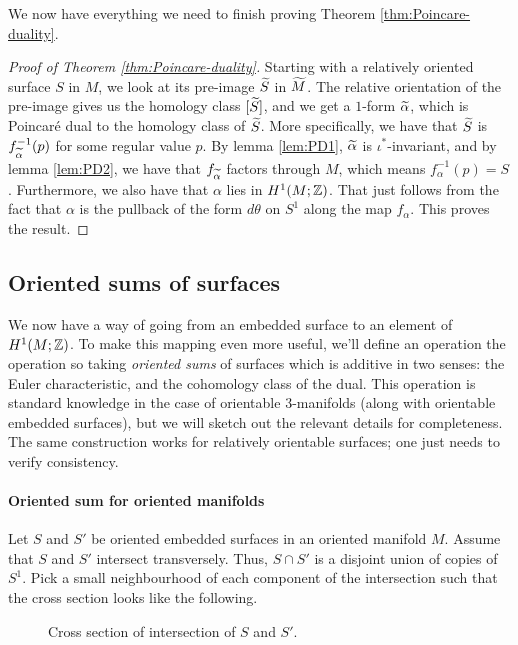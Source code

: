 We now have everything we need to finish proving Theorem \ref{thm:Poincare-duality}.
\begin{proof}[Proof of Theorem \ref{thm:Poincare-duality}]
  Starting with a relatively oriented surface $S$ in $M$, we look at its pre-image $\widetilde{S}$ in
  $\widetilde{M}$. The relative orientation of the pre-image gives us the homology class $[\widetilde{S}]$, and
  we get a $1$-form $\widetilde{\alpha}$, which is Poincar\'e dual to the homology class of $\widetilde{S}$.
  More specifically, we have that $\widetilde{S}$ is $f^{-1}_{\widetilde{\alpha}}(p)$ for some regular value $p$.
  By lemma \ref{lem:PD1}, $\widetilde{\alpha}$ is $\iota^{\ast}$-invariant, and by lemma \ref{lem:PD2}, we
  have that $f_{\widetilde{\alpha}}$ factors through $M$, which means $f_{\alpha}^{-1}(p) =
  S$. Furthermore, we also have that $\alpha$ lies in $H^1(M; \mathbb{Z})$. That just follows from the
  fact that $\alpha$ is the pullback of the form $d\theta$ on $S^1$ along the map
  $f_{\alpha}$. This proves the result.
\end{proof}

\subsection{Oriented sums of surfaces}
\label{sec:orient-sums-surf}

We now have a way of going from an embedded surface to an element of $H^1(M; \mathbb{Z})$. To make this
mapping even more useful, we'll define an operation the operation so taking \emph{oriented sums} of
surfaces which is additive in two senses: the Euler characteristic, and the cohomology class of the
dual. This operation is standard knowledge in the case of orientable $3$-manifolds (along with
orientable embedded surfaces), but we will sketch out the relevant details for completeness. The
same construction works for relatively orientable surfaces; one just needs to verify consistency.

\paragraph{Oriented sum for oriented manifolds}
Let $S$ and $S'$ be oriented embedded surfaces in an oriented manifold $M$. Assume that $S$ and
$S'$ intersect transversely. Thus, $S \cap S'$ is a disjoint union of copies of $S^1$. Pick a small
neighbourhood of each component of the intersection such that the cross section looks like the
following.
\begin{figure}[h]
  \centering
  \caption{Cross section of intersection of $S$ and $S'$.}
  \label{fig:cross-section}
\end{figure}

